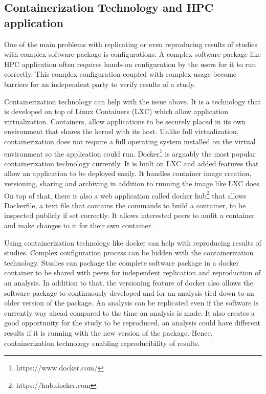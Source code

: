 \subsection{Containerization Technology and HPC application}




One of the main problems with replicating or even reproducing results of studies with complex software package is configurations. A complex software package like HPC application often requires hands-on configuration by the users for it to run correctly. This complex configuration coupled with complex usage become barriers for an independent party to verify results of a study.

Containerization technology can help with the issue above. It is a technology that is developed on top of Linux Containers (LXC) which allow application virtualization. Containers, allow applications to be securely placed in its own environment that shares the kernel with its host. Unlike full virtualization, containerization does not require a full operating system installed on the virtual environment so the application could run. Docker\footnote{https://www.docker.com/} is arguably the most popular containerization technology currently. It is built on LXC and added features that allow an application to be deployed easily. It handles container image creation, versioning, sharing and archiving in addition to running the image like LXC does. On top of that, there is also a web application called docker hub\footnote{https://hub.docker.com} that allows Dockerfile, a text file that contains the commands to build a container, to be inspected publicly if set correctly. It allows interested peers to audit a container and make changes to it for their own container.

Using containerization technology like docker can help with reproducing results of studies. Complex configuration process can be hidden with the containerization technology. Studies can package the complete software package in a docker container to be shared with peers for independent replication and reproduction of an analysis. In addition to that, the versioning feature of docker also allows the software package to continuously developed and for an analysis tied down to an older version of the package. An analysis can be replicated even if the software is currently way ahead compared to the time an analysis is made. It  also creates a good opportunity for the study to be reproduced, an analysis could have different results if it is running with the new version of the package. Hence, containerization technology enabling reproducibility of results.

